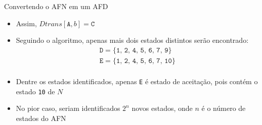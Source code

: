 \begin{frame}[fragile]{Convertendo o AFN em um AFD}

    \begin{itemize}
        \item Assim, $Dtrans[\texttt{A}, b] = \texttt{C}$

        \item Seguindo o algoritmo, apenas mais dois estados distintos serão encontrado:
        \[
            \begin{array}{l}
                \texttt{D} = \{\texttt{1, 2, 4, 5, 6, 7, 9}\} \\
                \texttt{E} = \{\texttt{1, 2, 4, 5, 6, 7, 10}\} \\
            \end{array}
        \]

        \item Dentre os estados identificados, apenas \texttt{E} é estado de aceitação, pois contém o estado \texttt{10} de $N$

        \item No pior caso, seriam identificados $2^n$ novos estados, onde $n$ é o número de estados do AFN
    \end{itemize}

\end{frame}

